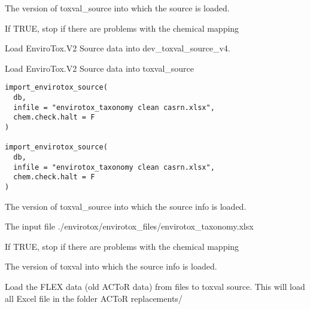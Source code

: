 \documentclass[letterpaper]{book}
\begin{document}
%
\begin{Arguments}
\begin{ldescription}
\item[\code{db}] The version of toxval\_source into which the source is loaded.

\item[\code{chem.check.halt}] If TRUE, stop if there are problems with the chemical mapping
\end{ldescription}
\end{Arguments}
%
\begin{Description}\relax
Load EnviroTox.V2 Source data into dev\_toxval\_source\_v4.

Load EnviroTox.V2 Source data into toxval\_source
\end{Description}
%
\begin{Usage}
\begin{verbatim}
import_envirotox_source(
  db,
  infile = "envirotox_taxonomy clean casrn.xlsx",
  chem.check.halt = F
)

import_envirotox_source(
  db,
  infile = "envirotox_taxonomy clean casrn.xlsx",
  chem.check.halt = F
)
\end{verbatim}
\end{Usage}
%
\begin{Arguments}
\begin{ldescription}
\item[\code{db}] The version of toxval\_source into which the source info is loaded.

\item[\code{infile}] The input file ./envirotox/envirotox\_files/envirotox\_taxonomy.xlsx

\item[\code{chem.check.halt}] If TRUE, stop if there are problems with the chemical mapping

\item[\code{toxval.db}] The version of toxval into which the source info is loaded.
\end{ldescription}
\end{Arguments}
%
\begin{Description}\relax
Load the FLEX data (old ACToR data) from files to toxval source. This will load all
Excel file in the folder ACToR replacements/
\end{Description}
\end{document}
